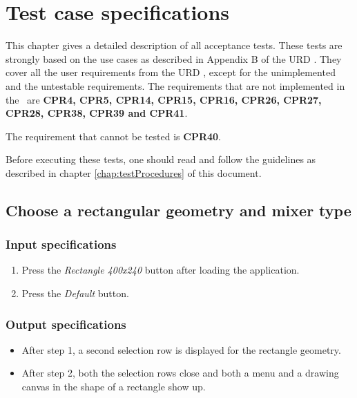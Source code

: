 \chapter{Test case specifications}
\label{chap:testCaseSpecs}
\renewcommand{\atref}[1]{AT\ref{at:#1}}

This chapter gives a detailed description of all acceptance tests. These tests are strongly based on the use cases as described in Appendix B of the URD \cite{urd}. They cover all the user requirements from the URD \cite{urd}, except for the unimplemented and the untestable requirements.
The requirements that are not implemented in the \applicationname\ are \textbf{CPR4, CPR5, CPR14, CPR15, CPR16, CPR26, CPR27, CPR28, CPR38, CPR39 and CPR41}.

The requirement that cannot be tested is \textbf{CPR40}.

Before executing these tests, one should read and follow the guidelines as described in chapter \ref{chap:testProcedures} of this document.

\section{Choose a rectangular geometry and mixer type}

\subsection*{Input specifications}
\begin{enumerate}
\item Press the \emph{Rectangle 400x240} button after loading the application.
\item Press the \emph{Default} button.
\end{enumerate}

\subsection*{Output specifications}
\begin{itemize}
\item After step 1, a second selection row is displayed for the rectangle geometry.
\item After step 2, both the selection rows close and both a menu and a drawing canvas in the shape of a rectangle show up.
\end{itemize}
 
